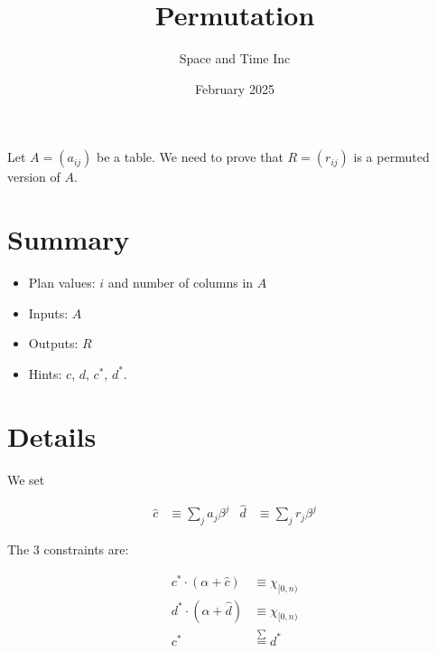 \documentclass[11pt]{article}
\title{Permutation}
\author{Space and Time Inc}
\date{February 2025}
\begin{document}
\maketitle

\noindent Let $A=(a_{ij})$ be a table. We need to prove that $R=(r_{ij})$ is a permuted version of $A$. \\

\section{Summary}
\begin{itemize}
    \item Plan values: $i$ and number of columns in $A$
    \item Inputs: $A$
    \item Outputs: $R$
    \item Hints: $c$, $d$, $c^\ast$, $d^\ast$.
\end{itemize}

\section{Details}
We set 

\begin{align*}
    \hat{c} &\equiv \sum_j a_j \beta^j &\hat{d} &\equiv \sum_j r_ j \beta^j
\end{align*}

The $3$ constraints are:

\begin{align*}
    c^\ast \cdot (\alpha + \hat{c}) &\equiv \chi_{[0,n)}\\
    d^\ast \cdot (\alpha + \hat{d}) &\equiv \chi_{[0,n)}\\
    c^\ast &\overset{\sum}{=} d^\ast
\end{align*}
\end{document}
